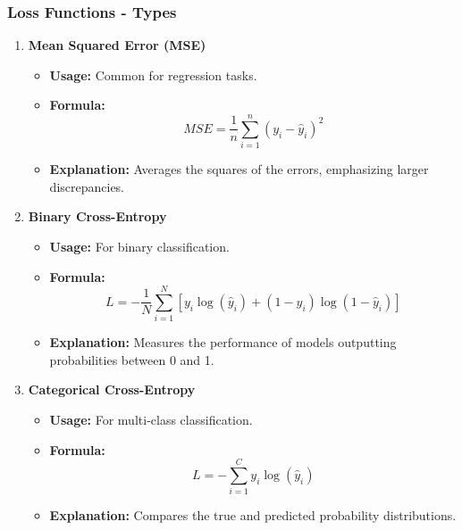 \documentclass[aspectratio=169]{beamer}
\begin{document}
\begin{frame}[fragile]
  \frametitle{Loss Functions - Types}
  \begin{enumerate}
    \item \textbf{Mean Squared Error (MSE)}
      \begin{itemize}
        \item \textbf{Usage:} Common for regression tasks.
        \item \textbf{Formula:} 
        \begin{equation}
          MSE = \frac{1}{n} \sum_{i=1}^{n} (y_i - \hat{y}_i)^2
        \end{equation}
        \item \textbf{Explanation:} Averages the squares of the errors, emphasizing larger discrepancies.
      \end{itemize}

    \item \textbf{Binary Cross-Entropy}
      \begin{itemize}
        \item \textbf{Usage:} For binary classification.
        \item \textbf{Formula:}
        \begin{equation}
          L = -\frac{1}{N} \sum_{i=1}^{N} \left[ y_i \log(\hat{y}_i) + (1 - y_i) \log(1 - \hat{y}_i) \right]
        \end{equation}
        \item \textbf{Explanation:} Measures the performance of models outputting probabilities between 0 and 1.
      \end{itemize}

    \item \textbf{Categorical Cross-Entropy}
      \begin{itemize}
        \item \textbf{Usage:} For multi-class classification.
        \item \textbf{Formula:}
        \begin{equation}
          L = -\sum_{i=1}^{C} y_i \log(\hat{y}_i)
        \end{equation}
        \item \textbf{Explanation:} Compares the true and predicted probability distributions.
      \end{itemize}
  \end{enumerate}
\end{frame}
\end{document}
